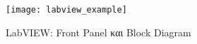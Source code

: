 \begin{figure}[h]
  \centering
  \texttt{[image: labview\_example]}
  \caption{LabVIEW: Front Panel και Block Diagram}
  \label{fig:labview_example}
\end{figure}



